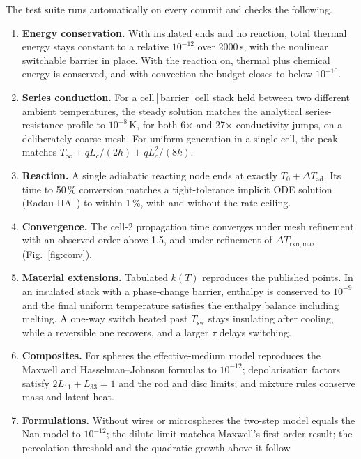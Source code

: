 \documentclass[11pt]{article}
\newcommand{\Tsw}{T_\mathrm{sw}}
\begin{document}
The test suite runs automatically on every commit and checks the following.
\begin{enumerate}
  \item \textbf{Energy conservation.} With insulated ends and no reaction, total thermal
        energy stays constant to a relative $10^{-12}$ over 2000\,s, with the nonlinear
        switchable barrier in place. With the reaction on, thermal plus chemical energy
        is conserved, and with convection the budget closes to below $10^{-10}$.
  \item \textbf{Series conduction.} For a cell\,|\,barrier\,|\,cell stack held between
        two different ambient temperatures, the steady solution matches the analytical
        series-resistance profile to $10^{-8}$\,K, for both 6$\times$ and 27$\times$
        conductivity jumps, on a deliberately coarse mesh. For uniform generation in a
        single cell, the peak matches $T_\infty + qL_c/(2h) + qL_c^2/(8k)$.
  \item \textbf{Reaction.} A single adiabatic reacting node ends at exactly
        $T_0 + \Delta T_\mathrm{ad}$. Its time to 50\,\% conversion matches a
        tight-tolerance implicit ODE solution (Radau IIA~\cite{hairer1996}) to within
        1\,\%, with and without the rate ceiling.
  \item \textbf{Convergence.} The cell-2 propagation time converges under mesh
        refinement with an observed order above 1.5, and under refinement of
        $\Delta T_\mathrm{rxn,max}$ (Fig.~\ref{fig:conv}).
  \item \textbf{Material extensions.} Tabulated $k(T)$ reproduces the published points.
        In an insulated stack with a phase-change barrier, enthalpy is conserved to
        $10^{-9}$ and the final uniform temperature satisfies the enthalpy balance
        including melting. A one-way switch heated past $\Tsw$ stays insulating after
        cooling, while a reversible one recovers, and a larger $\tau$ delays switching.
  \item \textbf{Composites.} For spheres the effective-medium model reproduces the
        Maxwell and Hasselman--Johnson formulas to $10^{-12}$; depolarisation factors
        satisfy $2L_{11} + L_{33} = 1$ and the rod and disc limits; and mixture rules
        conserve mass and latent heat.
  \item \textbf{Formulations.} Without wires or microspheres the two-step model equals
        the Nan model to $10^{-12}$; the dilute limit matches Maxwell's first-order
        result; the percolation threshold and the quadratic growth above it follow

\end{enumerate}
\end{document}
